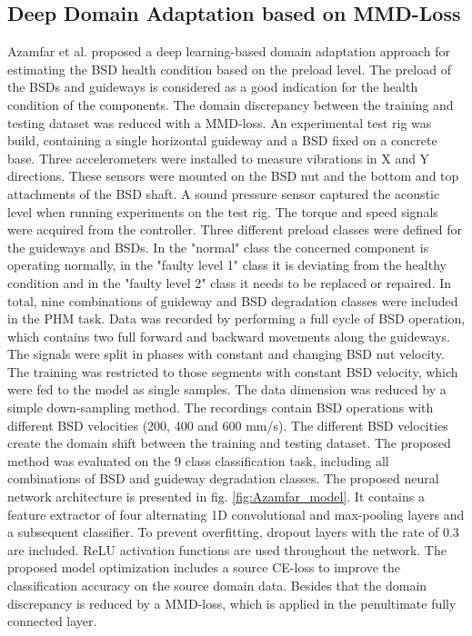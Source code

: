 \subsection{Deep Domain Adaptation based on MMD-Loss}
Azamfar et al. \cite{AZAMFAR2020103932} proposed a deep learning-based domain adaptation approach for estimating the BSD health condition based on the preload level. The preload of the BSDs and guideways is considered as a good indication for the health condition of the components. The domain discrepancy between the training and testing dataset was reduced with a MMD-loss. An experimental test rig was build, containing a single horizontal guideway and a BSD fixed on a concrete base. Three accelerometers were installed to measure vibrations in X and Y directions. These sensors were mounted on the BSD nut and the bottom and top attachments of the BSD shaft. A sound pressure sensor captured the acoustic level when running experiments on the test rig. The torque and speed signals were acquired from the controller. Three different preload classes were defined for the guideways and BSDs. In the "normal" class the concerned component is operating normally, in the "faulty level 1" class it is deviating from the healthy condition and in the "faulty level 2" class it needs to be replaced or repaired. In total, nine combinations of guideway and BSD degradation classes were included in the PHM task. Data was recorded by performing a full cycle of BSD operation, which contains two full forward and backward movements along the guideways. The signals were split in phases with constant and changing BSD nut velocity. The training was restricted to those segments with constant BSD velocity, which were fed to the model as single samples. The data dimension was reduced by a simple down-sampling method. The recordings contain BSD operations with different BSD velocities (200, 400 and 600 mm/s). The different BSD velocities create the domain shift between the training and testing dataset. The proposed method was evaluated on the 9 class classification task, including all combinations of BSD and guideway degradation classes. The proposed neural network architecture is presented in fig. \ref{fig:Azamfar_model}. It contains a feature extractor of four alternating 1D convolutional and max-pooling layers and a subsequent classifier. To prevent overfitting, dropout layers with the rate of 0.3 are included. ReLU activation functions are used throughout the network. The proposed model optimization includes a source CE-loss to improve the classification accuracy on the source domain data. Besides that the domain discrepancy is reduced by a MMD-loss, which is applied in the penultimate fully connected layer. 

